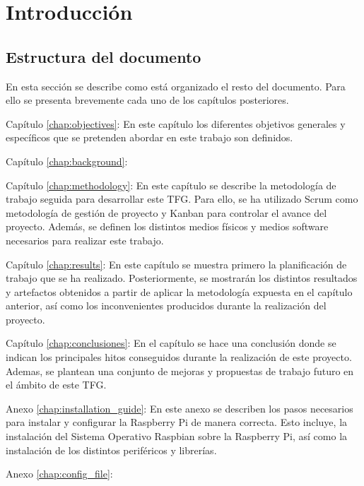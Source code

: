 \chapter{Introducción} %


\section{Estructura del documento}
En esta sección se describe como está organizado el resto del documento. Para ello se presenta brevemente cada uno de los capítulos posteriores.

\begin{definitionlist}
	\item[Capítulo \ref{chap:objectives}: \nameref{chap:objectives}] En este capítulo los diferentes objetivos generales y específicos que se pretenden abordar en este trabajo son definidos.
	
	\item[Capítulo \ref{chap:background}: \nameref{chap:background}] 
	
	\item[Capítulo \ref{chap:methodology}: \nameref{chap:methodology}] En este capítulo se describe la metodología de trabajo seguida para desarrollar este \ac{TFG}. Para ello, se ha utilizado Scrum como metodología de gestión de proyecto y Kanban para controlar el avance del proyecto. Además, se definen los distintos medios físicos y medios software necesarios para realizar este trabajo.
	
	\item[Capítulo \ref{chap:results}: \nameref{chap:results}] En este capítulo se muestra primero la planificación de trabajo que se ha realizado. Posteriormente, se mostrarán los distintos resultados y artefactos obtenidos a partir de aplicar la metodología expuesta en el capítulo anterior, así como los inconvenientes producidos durante la realización del proyecto.
	
	\item[Capítulo \ref{chap:conclusiones}: \nameref{chap:conclusiones}] En el capítulo se hace una conclusión donde se indican los principales hitos conseguidos durante la realización de este proyecto. Ademas, se plantean una conjunto de mejoras y propuestas de trabajo futuro en el ámbito de este \ac{TFG}. 
	
	\item[Anexo \ref{chap:installation_guide}: \nameref{chap:installation_guide}] En este anexo se describen los pasos necesarios para instalar y configurar la Raspberry Pi de manera correcta. Esto incluye, la instalación del Sistema Operativo Raspbian sobre la Raspberry Pi, así como la instalación de los distintos periféricos y librerías.
	
	\item[Anexo \ref{chap:config_file}: \nameref{chap:config_file}] 
	
\end{definitionlist}
